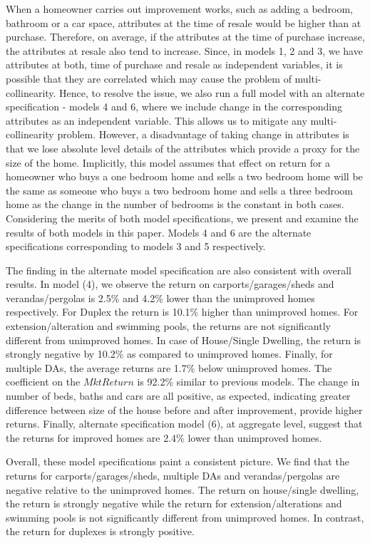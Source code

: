 \documentclass[AEJ,reqno, draftmode]{AEA} %
\begin{document}
When a homeowner carries out improvement works, such as adding a bedroom, bathroom or a car space, attributes at the time of resale would be higher than at purchase. Therefore, on average, if the attributes at the time of purchase increase, the attributes at resale also tend to increase. Since, in models 1, 2 and 3, we have attributes at both, time of purchase and resale as independent variables, it is possible that they are correlated which may cause the problem of multi-collinearity. Hence, to resolve the issue, we also run a full model with an alternate specification - models 4 and 6, where we include change in the corresponding attributes as an independent variable. This allows us to mitigate any multi-collinearity problem. However, a disadvantage of taking change in attributes is that we lose absolute level details of the attributes which provide a proxy for the size of the home. Implicitly, this model assumes that effect on return for a homeowner who buys a one bedroom home and sells a two bedroom home will be the same as someone who buys a two bedroom home and sells a three bedroom home as the change in the number of bedrooms is the constant in both cases. Considering the merits of both model specifications, we present and examine the results of both models in this paper. Models 4 and 6 are the alternate specifications corresponding to models 3 and 5 respectively.

The finding in the alternate model specification are also consistent with overall results. In model (4), we observe the return on carports/garages/sheds and verandas/pergolas is 2.5\% and 4.2\% lower than the unimproved homes respectively. For Duplex the return is 10.1\% higher than unimproved homes. For extension/alteration and swimming pools, the returns are not significantly different from unimproved homes. In case of House/Single Dwelling, the return is strongly negative by 10.2\% as compared to unimproved homes. Finally, for multiple DAs, the average returns are 1.7\% below unimproved homes. The coefficient on the $MktReturn$ is 92.2\% similar to previous models. The change in number of beds, baths and cars are all positive, as expected, indicating greater difference between size of the house before and after improvement, provide higher returns. Finally, alternate specification model (6), at aggregate level, suggest that the returns for improved homes are 2.4\% lower than unimproved homes.


Overall, these model specifications paint a consistent picture. We find that the returns for carports/garages/sheds, multiple DAs and verandas/pergolas are negative relative to the unimproved homes. The return on house/single dwelling, the return is strongly negative while the return for extension/alterations and swimming pools is not significantly different from unimproved homes. In contrast, the return for duplexes is strongly positive.
\end{document}
